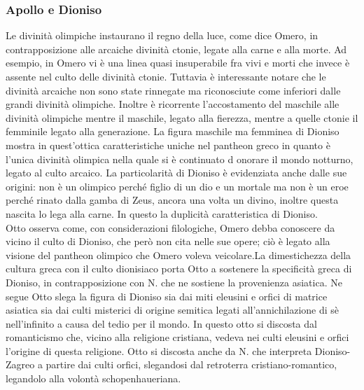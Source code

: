 \documentclass[10pt,a4paper]{article}
\begin{document}
\subsubsection{Apollo e Dioniso}
Le divinità olimpiche instaurano il regno della luce, come dice Omero, in contrapposizione alle arcaiche divinità ctonie, legate alla carne e alla morte. Ad esempio, in Omero vi è una linea quasi insuperabile fra vivi e morti che invece è assente nel culto delle divinità ctonie. Tuttavia è interessante notare che le divinità arcaiche non sono state rinnegate ma riconosciute come inferiori dalle grandi divinità olimpiche. Inoltre è ricorrente l'accostamento del maschile alle divinità olimpiche mentre il maschile, legato alla fierezza, mentre a quelle ctonie il femminile legato alla generazione. La figura maschile ma femminea di Dioniso mostra in quest'ottica caratteristiche uniche nel pantheon greco in quanto è l'unica divinità olimpica nella quale si è continuato d onorare il mondo notturno, legato al culto arcaico. La particolarità di Dioniso è evidenziata anche dalle sue origini: non è un olimpico perché figlio di un dio e un mortale ma non è un eroe perché rinato dalla gamba di Zeus, ancora una volta un divino, inoltre questa nascita lo lega alla carne. In questo la duplicità caratteristica di Dioniso.\\
Otto osserva come, con considerazioni filologiche, Omero debba conoscere da vicino il culto di Dioniso, che però non cita nelle sue opere; ciò è legato alla visione del pantheon olimpico che Omero voleva veicolare.La dimestichezza della cultura greca con il culto dionisiaco porta Otto a sostenere la specificità greca di Dioniso, in contrapposizione con N. che ne sostiene la provenienza asiatica. Ne segue Otto slega la figura di Dioniso sia dai miti eleusini e orfici di matrice asiatica sia dai culti misterici di origine semitica legati all'annichilazione di sè nell'infinito a causa del tedio per il mondo. In questo otto si discosta dal romanticismo che, vicino alla religione cristiana, vedeva nei culti eleusini e orfici l'origine di questa religione. Otto si discosta anche da N. che interpreta Dioniso-Zagreo a partire dai culti orfici, slegandosi dal retroterra cristiano-romantico, legandolo alla volontà schopenhaueriana.\\
\end{document}

